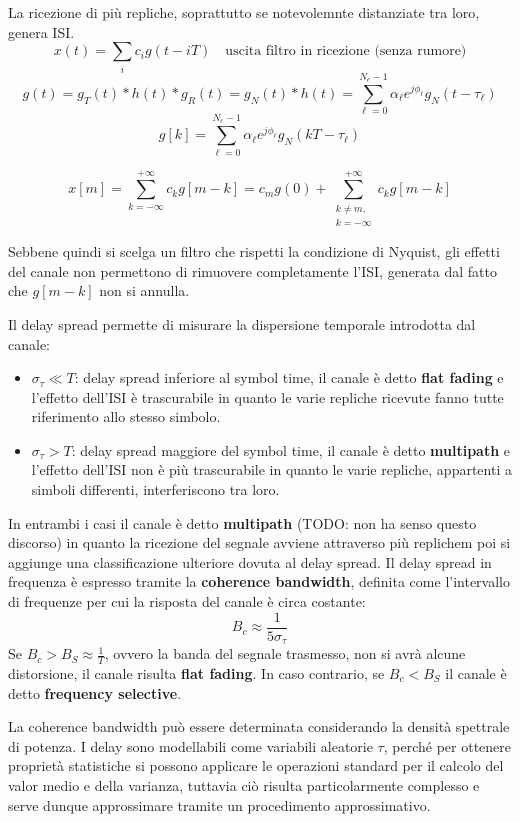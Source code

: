 La ricezione di più repliche, soprattutto se notevolemnte distanziate tra loro, genera ISI.
\[
    x(t) = \sum_{i} c_i g(t - iT) \quad \text{uscita filtro in ricezione (senza rumore)}
\]
\[
    g(t) = g_T(t) \ast h(t) \ast g_R(t) = g_N(t) \ast h(t) = \sum_{\ell=0}^{N_c-1} \alpha_{\ell} e^{j\phi_{\ell}} g_N(t - \tau_{\ell})
\]
\[
    g\left[k\right] = \sum_{\ell=0}^{N_c-1} \alpha_{\ell} e^{j\phi_{\ell}} g_N\left(kT - \tau_{\ell}\right)
\]

\[
    x\left[m\right] = \sum_{k=-\infty}^{+\infty} c_k g\left[m - k \right] = c_m g(0) + \sum_{\substack{k \neq m,\\ k=-\infty}}^{+\infty} c_{k} g\left[m-k\right]
\]


Sebbene quindi si scelga un filtro che rispetti la condizione di Nyquist, gli effetti del canale non permettono di rimuovere completamente l'ISI, generata dal fatto che $g\left[m-k\right]$ non si annulla.


Il delay spread permette di misurare la dispersione temporale introdotta dal canale:
\begin{itemize}
    \item $\sigma_\tau \ll T$: delay spread inferiore al symbol time, il canale è detto \textbf{flat fading}  e l'effetto dell'ISI è trascurabile in quanto le varie repliche ricevute fanno tutte riferimento allo stesso simbolo.
    \item $\sigma_\tau > T$: delay spread maggiore del symbol time, il canale è detto \textbf{multipath} e l'effetto dell'ISI non è più trascurabile in quanto le varie repliche, appartenti a simboli differenti, interferiscono tra loro.
\end{itemize}

In entrambi i casi il canale è detto \textbf{multipath} (TODO: non ha senso questo discorso) in quanto la ricezione del segnale avviene attraverso più replichem poi si aggiunge una classificazione ulteriore dovuta al delay spread.
Il delay spread in frequenza è espresso tramite la \textbf{coherence bandwidth}, definita come l'intervallo di frequenze per cui la risposta del canale è circa costante: 
\[
    B_c \approx \frac{1}{5\sigma_\tau}
\]
Se $B_c > B_S \approx \frac{1}{T}$, ovvero la banda del segnale trasmesso, non si avrà alcune distorsione, il canale risulta \textbf{flat fading}. In caso contrario, se $B_c < B_S$ il canale è detto \textbf{frequency selective}. 

La coherence bandwidth può essere determinata considerando la densità spettrale di potenza.
I delay sono modellabili come variabili aleatorie $\tau$, perché per ottenere proprietà statistiche si possono applicare le operazioni standard per il calcolo del valor medio e della varianza, tuttavia ciò risulta particolarmente complesso e serve dunque approssimare tramite un procedimento approssimativo.


